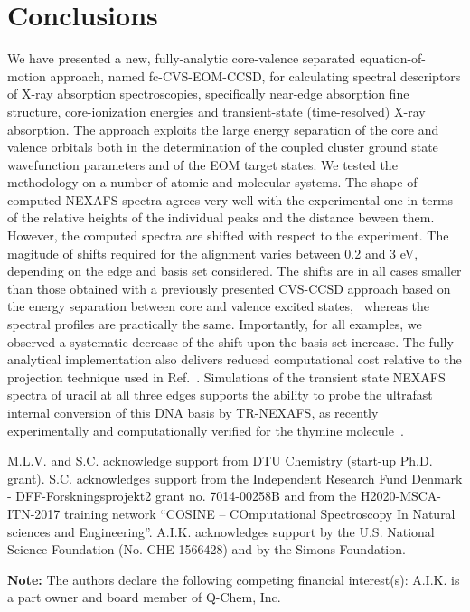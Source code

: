 \documentclass[journal=jctcce,manuscript=article]{achemso}
\begin{document}
\section{Conclusions}
We have presented a new, fully-analytic core-valence separated equation-of-motion approach,
named fc-CVS-EOM-CCSD, for calculating spectral descriptors of X-ray absorption spectroscopies, specifically near-edge absorption fine structure, core-ionization energies and transient-state (time-resolved) X-ray absorption. The approach exploits the large energy separation of the core and valence orbitals both in the determination of the coupled cluster ground state wavefunction parameters and of the EOM target states.
We tested the methodology on a number of atomic and molecular systems. The shape of computed NEXAFS spectra agrees very well with the experimental one in terms of the relative heights of the individual peaks and the distance beween them. However, the computed spectra are shifted with respect to the experiment. The magitude of shifts required for the alignment varies between 0.2 and 3 eV, depending on the edge and basis set considered.
The shifts are in all cases smaller than those obtained with a previously presented CVS-CCSD approach based on the energy separation between core and valence excited states,~\cite{coriani2015jcp} whereas the spectral profiles are practically the same. Importantly, for all examples, we observed a systematic decrease of the shift upon the basis set increase.
The fully analytical implementation also delivers reduced computational 
cost relative to the projection technique used in Ref.~.
Simulations of the transient state NEXAFS spectra of uracil at all three edges 
supports the ability to probe the ultrafast internal conversion of this DNA basis by 
TR-NEXAFS, as recently experimentally and computationally verified for the thymine molecule~\cite{naturecomm}.

\begin{acknowledgement}
M.L.V. and S.C. acknowledge support from DTU Chemistry (start-up Ph.D. grant). S.C. acknowledges support from the Independent Research Fund Denmark - DFF-Forskningsprojekt2 grant no. 7014-00258B and from the H2020-MSCA-ITN-2017 training network ``COSINE -- COmputational Spectroscopy In Natural sciences and Engineering''.
A.I.K.  acknowledges support by  the U.S.  National Science Foundation
(No.  CHE-1566428) and by the Simons Foundation. 

{\bf Note:} The authors declare the following competing financial
interest(s): A.I.K. is a part owner and board member of Q-Chem, Inc.
\end{acknowledgement}
\end{document}
